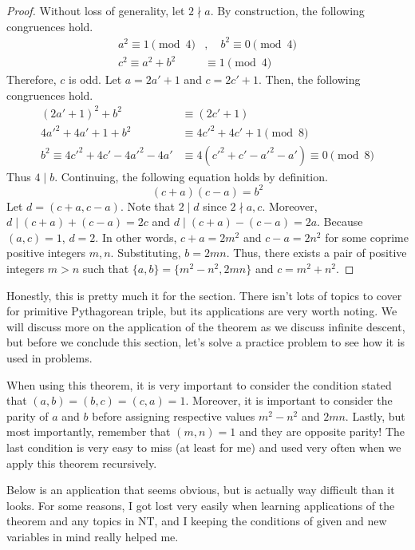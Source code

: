 \documentclass[../../main.tex]{subfiles}
\begin{document}
\begin{proof}
Without loss of generality, let $2 \nmid a$. By construction,
the following congruences hold.
\begin{align*}
    a^2 \equiv 1 \pmod{4}&, \quad b^2 \equiv 0 \pmod{4} \\
    c^2 \equiv a^2 + b^2 &\equiv 1 \pmod{4}
\end{align*}
Therefore, $c$ is odd. Let $a = 2a' + 1$ and $c = 2c' + 1$.
Then, the following congruences hold.
\begin{align*}
    (2a' + 1)^2 + b^2 &\equiv (2c' + 1) \\
    4a'^2 + 4a' + 1 + b^2 &\equiv 4c'^2 + 4c' + 1 \pmod{8} \\
    b^2 \equiv 4c'^2 + 4c' - 4a'^2 - 4a'
    &\equiv 4 (c'^2 + c' - a'^2 - a') \equiv 0 \pmod{8}
\end{align*}
Thus $4 \mid b$. Continuing, the following equation holds by
definition.
\[
(c + a)(c - a) = b^2
\]
Let $d = (c + a, c - a)$. Note that $2 \mid d$ since $2 \nmid a, c$.
Moreover, $d \mid (c + a) + (c - a) = 2c$ and $d \mid (c + a) -
(c - a) = 2a$. Because $(a, c) = 1$, $d = 2$. In other words,
$c + a = 2m^2$ and $c - a = 2n^2$ for some coprime positive
integers $m, n$. Substituting, $b = 2mn$. Thus, there exists
a pair of positive integers $m > n$ such that $\{ a, b \} =
\{ m^2 - n^2, 2mn \}$ and $c = m^2 + n^2$.
\end{proof}

Honestly, this is pretty much it for the section. There isn't
lots of topics to cover for primitive Pythagorean triple, but
its applications are very worth noting. We will discuss more
on the application of the theorem as we discuss infinite
descent, but before we conclude this section, let's solve
a practice problem to see how it is used in problems.

\begin{important}
When using this theorem, it is very important to consider the
condition stated that $(a, b) = (b, c) = (c, a) = 1$. Moreover,
it is important to consider the parity of $a$ and $b$ before
assigning respective values $m^2 - n^2$ and $2mn$. Lastly, but
most importantly, remember that $(m, n) = 1$ and they are opposite
parity! The last condition is very easy to miss (at least for me)
and used very often when we apply this theorem recursively.
\end{important}

Below is an application that seems obvious, but is actually
way difficult than it looks. For some reasons, I got lost very
easily when learning applications of the theorem and any topics
in NT, and I keeping the conditions of given and new variables
in mind really helped me.
\end{document}
